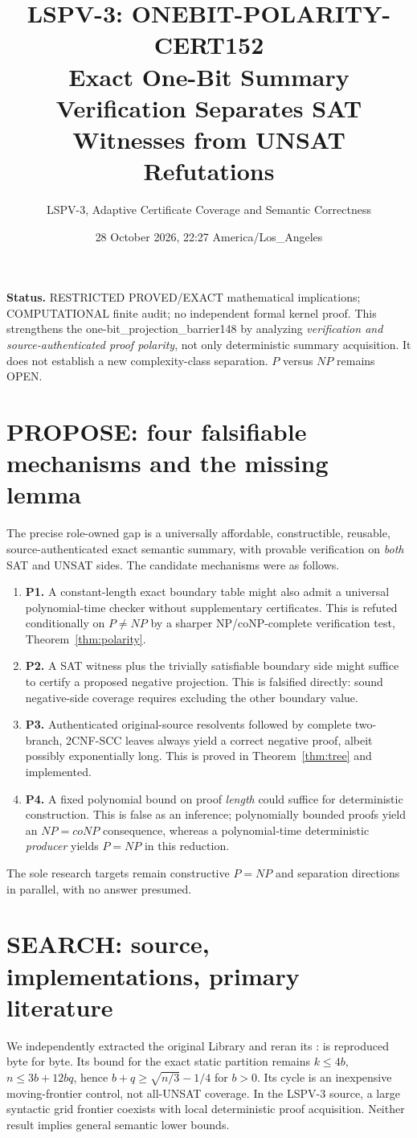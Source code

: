 \documentclass[11pt]{article}
\title{LSPV-3: ONEBIT-POLARITY-CERT152\\Exact One-Bit Summary Verification Separates SAT Witnesses from UNSAT Refutations}
\author{LSPV-3, Adaptive Certificate Coverage and Semantic Correctness}
\date{28 October 2026, 22:27 America/Los\_Angeles}
\begin{document}
\maketitle
\noindent\textbf{Status.} RESTRICTED PROVED/EXACT mathematical implications; COMPUTATIONAL finite audit; no independent formal kernel proof. This strengthens the one-bit\_projection\_barrier148 by analyzing \emph{verification and source-authenticated proof polarity}, not only deterministic summary acquisition. It does not establish a new complexity-class separation. $P$ versus $NP$ remains OPEN.

\section{PROPOSE: four falsifiable mechanisms and the missing lemma}
The precise role-owned gap is a universally affordable, constructible, reusable, source-authenticated exact semantic summary, with provable verification on \emph{both} SAT and UNSAT sides. The candidate mechanisms were as follows.
\begin{enumerate}
\item[] \textbf{P1.} A constant-length exact boundary table might also admit a universal polynomial-time checker without supplementary certificates. This is refuted conditionally on $P\ne NP$ by a sharper NP/coNP-complete verification test, Theorem~\ref{thm:polarity}.
\item[] \textbf{P2.} A SAT witness plus the trivially satisfiable boundary side might suffice to certify a proposed negative projection. This is falsified directly: sound negative-side coverage requires excluding the other boundary value.
\item[] \textbf{P3.} Authenticated original-source resolvents followed by complete two-branch, 2CNF-SCC leaves always yield a correct negative proof, albeit possibly exponentially long. This is proved in Theorem~\ref{thm:tree} and implemented.
\item[] \textbf{P4.} A fixed polynomial bound on proof \emph{length} could suffice for deterministic construction. This is false as an inference; polynomially bounded proofs yield an $NP=coNP$ consequence, whereas a polynomial-time deterministic \emph{producer} yields $P=NP$ in this reduction.
\end{enumerate}
The sole research targets remain constructive $P=NP$ and separation directions in parallel, with no answer presumed.

\section{SEARCH: source, implementations, primary literature}
We independently extracted the original Library  and reran its :  is reproduced byte for byte. Its bound for the exact static partition remains $k\le4b$, $n\le3b+12bq$, hence $b+q\ge\sqrt{n/3}-1/4$ for $b>0$. Its cycle is an inexpensive moving-frontier control, not all-UNSAT coverage. In the LSPV-3  source, a large syntactic grid frontier coexists with local deterministic proof acquisition. Neither result implies general semantic lower bounds.
\end{document}
